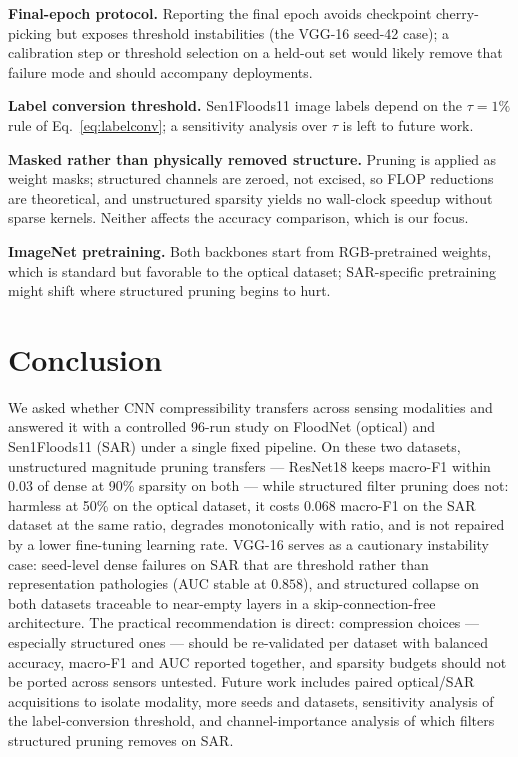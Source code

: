 \documentclass[conference]{IEEEtran}
\begin{document}
\textbf{Final-epoch protocol.} Reporting the final epoch avoids
checkpoint cherry-picking but exposes threshold instabilities (the
VGG-16 seed-42 case); a calibration step or threshold selection on a
held-out set would likely remove that failure mode and should
accompany deployments.

\textbf{Label conversion threshold.} Sen1Floods11 image labels depend
on the $\tau=1\%$ rule of Eq.~\eqref{eq:labelconv}; a sensitivity
analysis over $\tau$ is left to future work.

\textbf{Masked rather than physically removed structure.} Pruning is
applied as weight masks; structured channels are zeroed, not excised,
so FLOP reductions are theoretical, and unstructured sparsity yields
no wall-clock speedup without sparse kernels. Neither affects the
accuracy comparison, which is our focus.

\textbf{ImageNet pretraining.} Both backbones start from RGB-pretrained
weights, which is standard but favorable to the optical dataset;
SAR-specific pretraining might shift where structured pruning begins
to hurt.

\section{Conclusion}
We asked whether CNN compressibility transfers across sensing
modalities and answered it with a controlled 96-run study on FloodNet
(optical) and Sen1Floods11 (SAR) under a single fixed pipeline. On
these two datasets, unstructured magnitude pruning transfers ---
ResNet18 keeps macro-F1 within $0.03$ of dense at 90\% sparsity on
both --- while structured filter pruning does not: harmless at 50\% on
the optical dataset, it costs $0.068$ macro-F1 on the SAR dataset at
the same ratio, degrades monotonically with ratio, and is not repaired
by a lower fine-tuning learning rate. VGG-16 serves as a cautionary
instability case: seed-level dense failures on SAR that are threshold
rather than representation pathologies (AUC stable at $0.858$), and
structured collapse on both datasets traceable to near-empty layers in
a skip-connection-free architecture. The practical recommendation is
direct: compression choices --- especially structured ones --- should
be re-validated per dataset with balanced accuracy, macro-F1 and AUC
reported together, and sparsity budgets should not be ported across
sensors untested. Future work includes paired optical/SAR
acquisitions to isolate modality, more seeds and datasets,
sensitivity analysis of the label-conversion threshold, and
channel-importance analysis of which filters structured pruning
removes on SAR.
\end{document}
